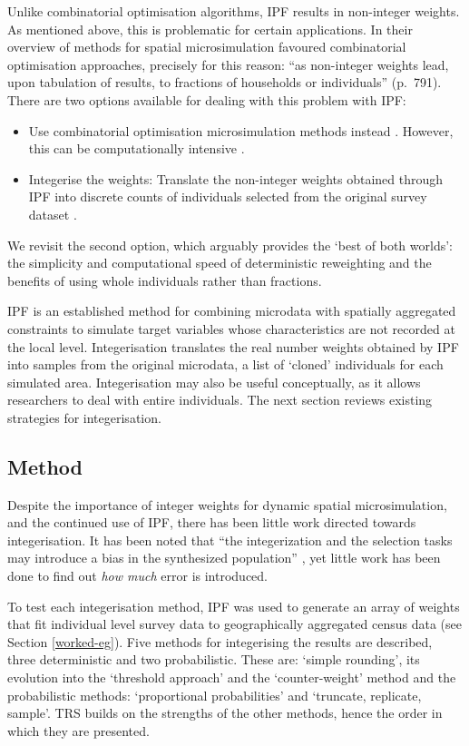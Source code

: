 \documentclass[a4paper, 11pt, twoside]{Thesis}
\begin{document}
Unlike combinatorial optimisation algorithms, IPF results in non-integer
weights. As mentioned above, this is problematic for certain applications.
In their overview of methods for spatial microsimulation
\citet{Williamson1998} favoured combinatorial
optimisation approaches, precisely for this reason:
``as non-integer weights lead, upon tabulation of results, to fractions of
households or individuals'' (p.\ 791). There are two options
available for dealing with this problem with IPF:
\begin{itemize}
\item Use combinatorial optimisation microsimulation methods instead
\citep{Williamson1998}. However, this can be computationally intensive
\citep{Pritchard2012}.
\item Integerise the weights: Translate the non-integer weights obtained
through IPF into discrete counts of individuals selected from the original
survey dataset \citep{Ballas2005c}.
\end{itemize}
We revisit the second option, which arguably provides the
`best of both worlds': the simplicity and computational speed of deterministic
reweighting and the benefits of using whole individuals rather than fractions.

IPF is an established method for combining microdata
with spatially aggregated constraints to simulate  target variables whose
characteristics are not recorded at the local level. Integerisation translates
the real number weights obtained by IPF into samples from the original
microdata, a list of `cloned' individuals for each simulated area.
Integerisation may also be useful conceptually, as it allows
researchers to deal with entire individuals. The next section
reviews existing strategies for integerisation.

\subsection{Method}
\label{strategies}
Despite the importance of integer weights for dynamic spatial microsimulation,
and the continued use of IPF, there
has been little work directed towards integerisation. It has been noted that
``the
integerization and the selection tasks may introduce a bias in the synthesized
population'' \citep[10]{Muller2010}, yet little work has been done to find out
\emph{how much} error is introduced.

To test each integerisation method, IPF was used to generate an
array of weights that fit individual level survey data to
geographically aggregated census data (see Section \ref{worked-eg}). Five
methods for
integerising the results are described, three deterministic and two
probabilistic. These are: `simple rounding', its evolution into the `threshold
approach' and the `counter-weight' method and the probabilistic methods:
`proportional probabilities' and `truncate, replicate, sample'. TRS
builds on the strengths of the other methods, hence the order in which they are
presented.
\end{document}
